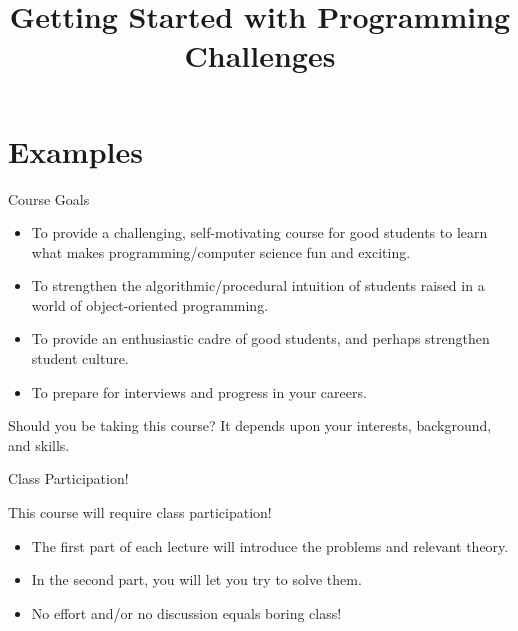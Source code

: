 \documentclass{beamer}
\title[Getting Started with Prog. Challenges]{Getting Started with Programming Challenges}
\begin{document}
\frame{
  \titlepage
}
 
\section{Examples}


\begin{frame}[fragile]{Course Goals}
  \begin{itemize}
  \item To provide a challenging, self-motivating course for good students to learn what makes programming/computer science fun and exciting.
\item To strengthen the algorithmic/procedural intuition of students raised in a world of object-oriented programming.
\item To provide an enthusiastic cadre of good students, and perhaps strengthen student culture.
\item To prepare for interviews and progress in your careers.
\end{itemize}

\begin{alertblock}{Should you be taking this course?}
  It depends upon your interests, background, and skills.
\end{alertblock}

\end{frame}


\begin{frame}{Class Participation!}
  \begin{alertblock}{This course will require class participation!}
    \begin{itemize}
    \item The first part of each lecture will introduce the problems and relevant theory.
    \item In the second part, you will let you try to solve them.
    \item<alert@1> No effort and/or no discussion equals boring class!
    \end{itemize}
  \end{alertblock}


\end{frame}

\end{document}
